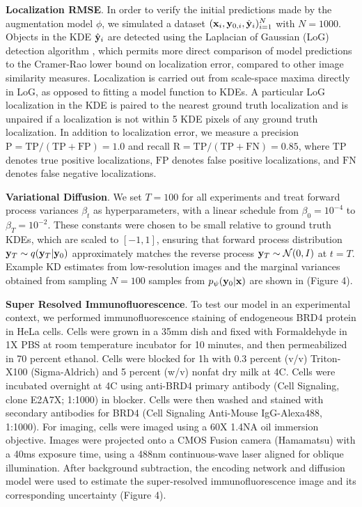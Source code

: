 \documentclass{article}
\begin{document}
\textbf{Localization RMSE}. In order to verify the initial predictions made by the augmentation model $\phi$, we simulated a dataset $(\bold{x}_i,\bold{y}_{0,i},\hat{\bold{y}}_{i})_{i=1}^{N}$ with $N=1000$. Objects in the KDE $\hat{\bold{y}}_{i}$  are detected using the Laplacian of Gaussian (LoG) detection algorithm \citep{Kong2013}, which permits more direct comparison of model predictions to the Cramer-Rao lower bound on localization error, compared to other image similarity measures. Localization is carried out from scale-space maxima directly in LoG, as opposed to fitting a model function to KDEs. A particular LoG localization in the KDE is paired to the nearest ground truth localization and is unpaired if a localization is not within 5 KDE pixels of any ground truth localization. In addition to localization error, we measure a precision $\mathrm{P = TP/(TP + FP)} = 1.0$ and recall $\mathrm{R = TP/(TP + FN)} = 0.85$, where $\mathrm{TP}$ denotes true positive localizations, $\mathrm{FP}$ denotes false positive localizations, and $\mathrm{FN}$ denotes false negative localizations.


\textbf{Variational Diffusion}. We set $T = 100$ for all experiments and treat forward process variances $\beta_{t}$ as hyperparameters, with a linear schedule from $\beta_{0}=10^{-4}$ to $\beta_{T}=10^{-2}$.
These constants were chosen to be small relative to ground truth KDEs, which are scaled to $[-1,1]$, ensuring that forward process distribution $\bold{y}_{T}\sim q(\bold{y}_{T}|\bold{y}_{0})$ approximately matches the reverse process $\bold{y}_T\sim \mathcal{N}(0, I)$ at $t=T$. Example KD estimates from low-resolution images and the marginal variances obtained from sampling $N=100$ samples from $p_{\psi}(\bold{y}_{0}|\bold{x})$ are shown in (Figure 4). 

\textbf{Super Resolved Immunofluorescence}. To test our model in an experimental context, we performed immunofluorescence staining of endogeneous BRD4 protein in HeLa cells. Cells were grown in a 35mm dish and fixed with Formaldehyde in 1X PBS at room temperature incubator for 10 minutes, and then permeabilized in 70 percent ethanol. Cells were blocked for 1h with 0.3 percent (v/v) Triton-X100 (Sigma-Aldrich) and 5 percent (w/v) nonfat dry milk at 4C. Cells were incubated overnight at 4C using anti-BRD4 primary antibody (Cell Signaling, clone E2A7X; 1:1000) in blocker. Cells were then washed and stained with secondary antibodies for BRD4 (Cell Signaling Anti-Mouse IgG-Alexa488, 1:1000). For imaging, cells were imaged using a 60X 1.4NA oil immersion objective. Images were projected onto a CMOS Fusion camera (Hamamatsu) with a 40ms exposure time, using a 488nm continuous-wave laser aligned for oblique illumination. After background subtraction, the encoding network and diffusion model were used to estimate the super-resolved immunofluorescence image and its corresponding uncertainty (Figure 4). 
\end{document}
